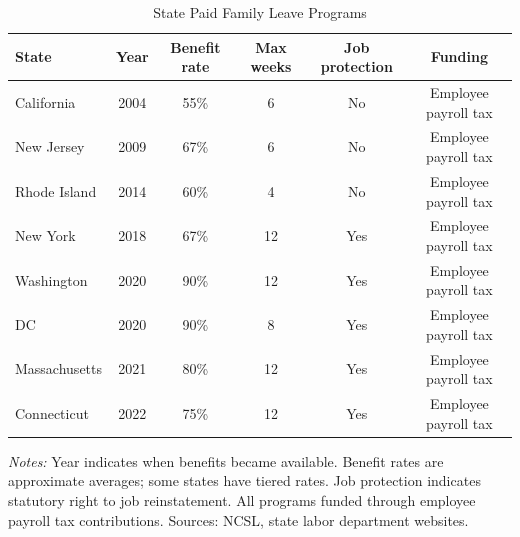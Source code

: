 \begin{table}[htbp]
\centering
\caption{State Paid Family Leave Programs}
\label{tab:pfl}
\begin{threeparttable}
\begin{tabular}{lccccc}
\hline\hline
State & Year & Benefit rate & Max weeks & Job protection & Funding \\
\hline
California & 2004 & 55\% & 6 & No & Employee payroll tax \\
New Jersey & 2009 & 67\% & 6 & No & Employee payroll tax \\
Rhode Island & 2014 & 60\% & 4 & No & Employee payroll tax \\
New York & 2018 & 67\% & 12 & Yes & Employee payroll tax \\
Washington & 2020 & 90\% & 12 & Yes & Employee payroll tax \\
DC & 2020 & 90\% & 8 & Yes & Employee payroll tax \\
Massachusetts & 2021 & 80\% & 12 & Yes & Employee payroll tax \\
Connecticut & 2022 & 75\% & 12 & Yes & Employee payroll tax \\
\hline\hline
\end{tabular}
\begin{tablenotes}[flushleft]\footnotesize
\item \textit{Notes:} Year indicates when benefits became available. Benefit rates are approximate averages; some states have tiered rates. Job protection indicates statutory right to job reinstatement. All programs funded through employee payroll tax contributions. Sources: NCSL, state labor department websites.
\end{tablenotes}
\end{threeparttable}
\end{table}
